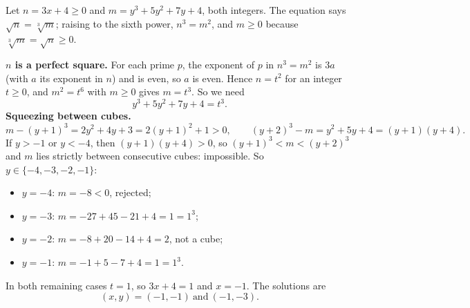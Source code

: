 Let $n=3x+4\ge0$ and $m=y^3+5y^2+7y+4$, both integers. The equation says $\sqrt n=\sqrt[3]m$; raising to the sixth power, $n^3=m^2$, and $m\ge0$ because $\sqrt[3]m=\sqrt n\ge0$.

\textbf{$n$ is a perfect square.} For each prime $p$, the exponent of $p$ in $n^3=m^2$ is $3a$ (with $a$ its exponent in $n$) and is even, so $a$ is even. Hence $n=t^2$ for an integer $t\ge0$, and $m^2=t^6$ with $m\ge0$ gives $m=t^3$. So we need
\[
y^3+5y^2+7y+4=t^3 .
\]
\textbf{Squeezing between cubes.}
\[
m-(y+1)^3=2y^2+4y+3=2(y+1)^2+1>0,\qquad (y+2)^3-m=y^2+5y+4=(y+1)(y+4).
\]
If $y>-1$ or $y<-4$, then $(y+1)(y+4)>0$, so $(y+1)^3<m<(y+2)^3$ and $m$ lies strictly between consecutive cubes: impossible. So $y\in\{-4,-3,-2,-1\}$:
\begin{itemize}
\item $y=-4$: $m=-8<0$, rejected;
\item $y=-3$: $m=-27+45-21+4=1=1^3$;
\item $y=-2$: $m=-8+20-14+4=2$, not a cube;
\item $y=-1$: $m=-1+5-7+4=1=1^3$.
\end{itemize}
In both remaining cases $t=1$, so $3x+4=1$ and $x=-1$. The solutions are
\[
\boxed{(x,y)=(-1,-1)\ \text{and}\ (-1,-3)}.
\]
